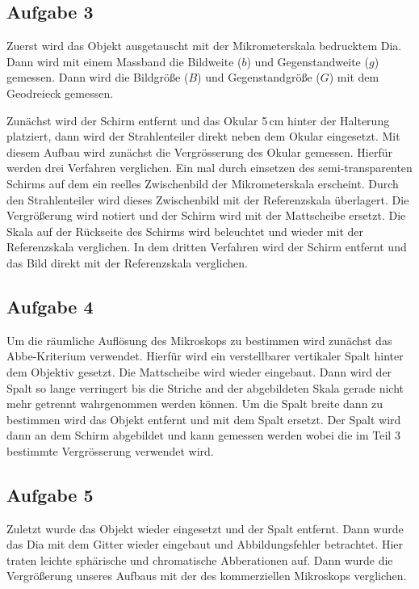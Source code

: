 \documentclass[11pt,a4paper]{article}
\begin{document}
\subsection{Aufgabe 3}

Zuerst wird das Objekt ausgetauscht mit der Mikrometerskala bedrucktem Dia. Dann wird mit einem Massband die Bildweite ($b$) und Gegenstandweite ($g$) gemessen. Dann wird die Bildgröße ($B$) und Gegenstandgröße ($G$) mit dem Geodreieck gemessen. 

Zunächst wird der Schirm entfernt und das Okular 5\,cm hinter der Halterung platziert, dann wird der Strahlenteiler direkt neben dem Okular eingesetzt. Mit diesem Aufbau wird zunächst die Vergrösserung des Okular gemessen. Hierfür werden drei Verfahren verglichen. Ein mal durch einsetzen des semi-transparenten Schirms auf dem ein reelles Zwischenbild der Mikrometerskala erscheint. Durch den Strahlenteiler wird dieses Zwischenbild mit der Referenzskala überlagert. Die Vergrößerung wird notiert und der Schirm wird mit der Mattscheibe ersetzt. Die Skala auf der Rückseite des Schirms wird beleuchtet und wieder mit der Referenzskala verglichen. In dem dritten Verfahren wird der Schirm entfernt und das Bild direkt mit der Referenzskala verglichen. 

\subsection{Aufgabe 4}

Um die räumliche Auflösung des Mikroskops zu bestimmen wird zunächst das Abbe-Kriterium verwendet. Hierfür wird ein verstellbarer vertikaler Spalt hinter dem Objektiv gesetzt. Die Mattscheibe wird wieder eingebaut. Dann wird der Spalt so lange verringert bis die Striche and der abgebildeten Skala gerade nicht mehr getrennt wahrgenommen werden können. Um die Spalt breite dann zu bestimmen wird das Objekt entfernt und mit dem Spalt ersetzt. Der Spalt wird dann an dem Schirm abgebildet und kann gemessen werden wobei die im Teil 3 bestimmte Vergrösserung verwendet wird. 

\subsection{Aufgabe 5}

Zuletzt wurde das Objekt wieder eingesetzt und der Spalt entfernt. Dann wurde das Dia mit dem Gitter wieder eingebaut und Abbildungsfehler betrachtet. Hier traten leichte sphärische und chromatische Abberationen auf. Dann wurde die Vergrößerung unseres Aufbaus mit der des kommerziellen Mikroskops verglichen. 
\end{document}
